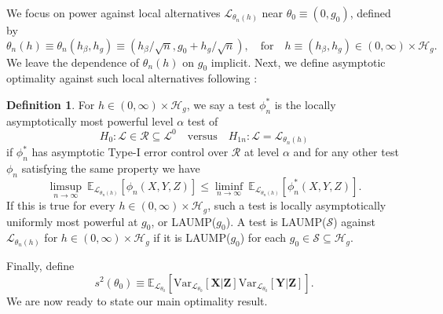 \documentclass[12pt]{article}
\theoremstyle{definition}
\newtheorem{definition}{Definition}
\theoremstyle{remark}
\newcommand{\E}{\mathbb E}								%
\newcommand{\V}{\mathrm{Var}}							%
\newcommand{\prx}{\bm X}								%
\newcommand{\srx}{X}									%
\newcommand{\prz}{\bm Z}								%
\newcommand{\srz}{Z}									%
\newcommand{\pry}{{\bm Y}}								%
\newcommand{\sry}{Y}									%
\newcommand{\law}{\mathcal L}							%
\newcommand{\nulllaws}{\mathscr L^0}					%
\newcommand{\regclass}{\mathscr R}					    %
\renewcommand{\H}{\mathcal H}		 					%
\begin{document}
	We focus on power against local alternatives $\law_{\theta_n(h)}$ near $\theta_0 \equiv (0, g_0)$, defined by 
	\begin{equation}
		\theta_n(h) \equiv \theta_n(h_\beta, h_g) \equiv (h_\beta/\sqrt n, g_0 + h_g/\sqrt n), \quad \text{for} \quad h \equiv (h_\beta, h_g) \in (0, \infty) \times \H_g.
		\label{eq:local-alternatives}
	\end{equation}
	We leave the dependence of $\theta_n(h)$ on $g_0$ implicit. Next, we define asymptotic optimality against such local alternatives following \citet{Choi1996}:
	\begin{definition}
		For $h \in (0, \infty) \times \H_g$, we say a test $\phi^*_n$ is the locally asymptotically most powerful level $\alpha$ test of 
		\begin{equation}
			H_{0}: \law \in  \regclass\subseteq \nulllaws \quad \text{versus}  \quad H_{1n}: \law = \law_{\theta_n(h)}
			\label{eq:testing-problem}
		\end{equation}
		if $\phi^*_n$ has asymptotic Type-I error control over $ \regclass$ at level $\alpha$ and for any other test $\phi_n$ satisfying the same property we have
		\begin{equation}
			\limsup_{n \rightarrow \infty}\  \E_{\law_{\theta_n(h)}}[\phi_n(\srx, \sry, \srz)] \leq \liminf_{n \rightarrow \infty}\ \E_{\law_{\theta_n(h)}}[ \phi^{*}_n(\srx, \sry, \srz)].
			\label{eq:power-bound}
		\end{equation}
		If this is true for every $h \in (0, \infty) \times \H_g$, such a test is locally asymptotically uniformly most powerful at $g_0$, or LAUMP($g_0$). A test is LAUMP($\mathcal{S}$) against $\law_{\theta_n(h)}$ for $h \in (0, \infty) \times \H_g$ if it is LAUMP($g_0$) for each $g_0 \in\mathcal{S}\subseteq \H_g$.
		
	\end{definition}
	
	Finally, define 
	\begin{equation}
		s^2(\theta_0) \equiv \E_{\law_{\theta_0}}[\V_{\law_{\theta_0}}[\prx|\prz]\V_{\law_{\theta_0}}[\pry|\prz]].
	\end{equation}
	We are now ready to state our main optimality result.
	
\end{document}
